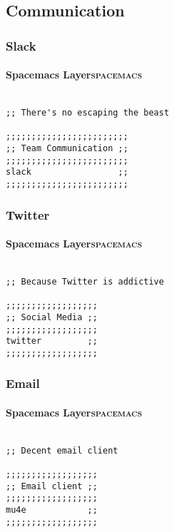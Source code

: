 \documentclass[11pt]{article}
\begin{document}
\subsection{Communication}
\label{sec:org24ebf2f}
\subsubsection{Slack}
\label{sec:org3bdea9b}

\paragraph{Spacemacs Layer\hfill{}\textsc{spacemacs}}
\label{sec:orgdcb531f}
\begin{verbatim}

;; There's no escaping the beast

;;;;;;;;;;;;;;;;;;;;;;;;
;; Team Communication ;;
;;;;;;;;;;;;;;;;;;;;;;;;
slack                 ;;
;;;;;;;;;;;;;;;;;;;;;;;;
\end{verbatim}

\subsubsection{Twitter}
\label{sec:orgc001f58}

\paragraph{Spacemacs Layer\hfill{}\textsc{spacemacs}}
\label{sec:org7fa68b1}
\begin{verbatim}

;; Because Twitter is addictive

;;;;;;;;;;;;;;;;;;
;; Social Media ;;
;;;;;;;;;;;;;;;;;;
twitter         ;;
;;;;;;;;;;;;;;;;;;
\end{verbatim}

\subsubsection{Email}
\label{sec:orgcfb80bc}

\paragraph{Spacemacs Layer\hfill{}\textsc{spacemacs}}
\label{sec:orgb0a65e9}
\begin{verbatim}

;; Decent email client

;;;;;;;;;;;;;;;;;;
;; Email client ;;
;;;;;;;;;;;;;;;;;;
mu4e            ;;
;;;;;;;;;;;;;;;;;;
\end{verbatim}
\end{document}
